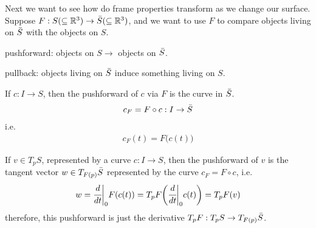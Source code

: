 \documentclass[10pt]{article}
\begin{document}
            Next we want to see how do frame properties transform as we change our surface. Suppose $F: S(\subseteq\mathbb{R}^3) \rightarrow \Bar{S}(\subseteq\mathbb{R}^3)$, and we want to use $F$ to compare objects living on $\Bar{S}$ with the objects on $S$.
            \begin{definition}
                pushforward: objects on $S \rightarrow$ objects on $\Bar{S}$.
                
                pullback: objects living on $\Bar{S}$ induce something living on $S$.
            \end{definition}

            \begin{example}
                If $c: I\rightarrow S$, then the pushforward of $c$ via $F$ is the curve in $\Bar{S}$.
                \begin{equation*}
                    \begin{aligned}
                        c_F = F\circ c: I\rightarrow\Bar{S}
                    \end{aligned}
                \end{equation*}
                i.e.
                \begin{equation*}
                    \begin{aligned}
                        c_F(t) = F\big(c(t)\big)
                    \end{aligned}
                \end{equation*}
            \end{example}
            \begin{example}
                If $v\in T_pS$,  represented by a curve $c:I\rightarrow S$, then the pushforward of $v$ is the tangent vector $w\in T_{F(p)}\Bar{S}$ represented by the curve $c_F = F\circ c$, i.e.
                \begin{equation*}
                    \begin{aligned}
                        w = \cfrac{d}{dt}\bigg|_0F(c(t)) = T_pF\bigg(\cfrac{d}{dt}\bigg|_0c(t)\bigg) = T_pF(v)
                    \end{aligned}
                \end{equation*}
                therefore, this pushforward is just the derivative $T_pF: T_pS\rightarrow T_{F(p)}\Bar{S}$.
            \end{example}
\end{document}

